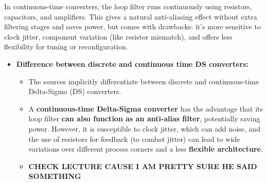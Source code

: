 \documentclass[
  a4paper,
]{article}
\providecommand{\tightlist}{%
  \setlength{\itemsep}{0pt}\setlength{\parskip}{0pt}}
\begin{document}
\begin{itemize}
  In continuous-time converters, the loop filter runs continuously using
  resistors, capacitors, and amplifiers. This gives a natural
  anti-aliasing effect without extra filtering stages and saves power,
  but comes with drawbacks: it's more sensitive to clock jitter,
  component variation (like resistor mismatch), and offers less
  flexibility for tuning or reconfiguration.

  \begin{itemize}
  \tightlist
  \item
    \textbf{Difference between discrete and continuous time DS
    converters:}

    \begin{itemize}
    \tightlist
    \item
      The sources implicitly differentiate between discrete and
      continuous-time Delta-Sigma (DS) converters.
    \item
      A \textbf{continuous-time Delta-Sigma converter} has the advantage
      that its loop filter \textbf{can also function as an anti-alias
      filter}, potentially saving power. However, it is susceptible to
      clock jitter, which can add noise, and the use of resistors for
      feedback (to combat jitter) can lead to wide variations over
      different process corners and a less \textbf{flexible
      architecture}.
    \item
      \textbf{CHECK LECTURE CAUSE I AM PRETTY SURE HE SAID SOMETHING}
    \end{itemize}
  \end{itemize}
\end{itemize}
\end{document}
